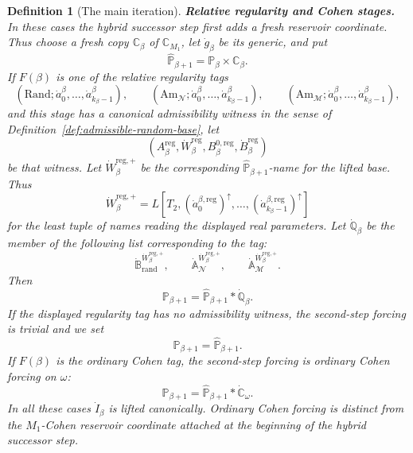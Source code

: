 \documentclass[a4paper,11pt]{article}
\newtheorem{definition}[theorem]{Definition}
\begin{document}
\begin{definition}[The main iteration]
\medskip
\noindent\textbf{Relative regularity and Cohen stages.}
In these cases the hybrid successor step first adds a fresh reservoir
coordinate.  Thus choose a fresh copy \(\mathbb C_\beta\) of
\(\mathbb C_{M_1}\), let \(\dot g_\beta\) be its generic, and put
\[
   \widehat{\mathbb P}_{\beta+1}=\mathbb P_\beta\times\mathbb C_\beta.
\]
If \(F(\beta)\) is one of the relative regularity tags
\[
   (\mathrm{Rand};\dot a^\beta_0,\ldots,
      \dot a^\beta_{k_\beta-1}),
   \qquad
   (\mathrm{Am}_{\mathcal N};\dot a^\beta_0,\ldots,
      \dot a^\beta_{k_\beta-1}),
   \qquad
   (\mathrm{Am}_{\mathcal M};\dot a^\beta_0,\ldots,
      \dot a^\beta_{k_\beta-1}),
\]
and this stage has a canonical admissibility witness in the sense of
Definition~\ref{def:admissible-random-base}, let
\[
   (A^{\mathrm{reg}}_\beta,
    \dot W^{\mathrm{reg}}_\beta,
    B^{0,\mathrm{reg}}_\beta,
    \dot B^{\mathrm{reg}}_\beta)
\]
be that witness.  Let \(\dot W^{\mathrm{reg},+}_\beta\) be the corresponding
\(\widehat{\mathbb P}_{\beta+1}\)-name for the lifted base.  Thus
\[
   \dot W^{\mathrm{reg},+}_\beta
   =L[T_2,(\dot a^{\beta,\mathrm{reg}}_0)^{\uparrow},\ldots,
      (\dot a^{\beta,\mathrm{reg}}_{k_\beta-1})^{\uparrow}]
\]
for the least tuple of names reading the displayed real parameters.  Let
\(\dot{\mathbb Q}_\beta\) be the member of the following list corresponding to
the tag:
\[
   \dot{\mathbb B}_{\mathrm{rand}}^{\dot W^{\mathrm{reg},+}_\beta},
   \qquad
   \dot{\mathbb A}_{\mathcal N}^{\dot W^{\mathrm{reg},+}_\beta},
   \qquad
   \dot{\mathbb A}_{\mathcal M}^{\dot W^{\mathrm{reg},+}_\beta}.
\]
Then
\[
   \mathbb P_{\beta+1}=\widehat{\mathbb P}_{\beta+1}*\dot{\mathbb Q}_\beta.
\]
If the displayed regularity tag has no admissibility witness, the second-step
forcing is trivial and we set
\[
   \mathbb P_{\beta+1}=\widehat{\mathbb P}_{\beta+1}.
\]
If \(F(\beta)\) is the ordinary Cohen
tag, the second-step forcing is ordinary Cohen forcing on \(\omega\):
\[
   \mathbb P_{\beta+1}=\widehat{\mathbb P}_{\beta+1}*\dot{\mathbb C}_{\omega}.
\]
In all these cases \(\dot I_\beta\) is lifted canonically.  Ordinary Cohen
forcing is distinct from the \(M_1\)-Cohen reservoir coordinate attached at the
beginning of the hybrid successor step.


\end{definition}
\end{document}
